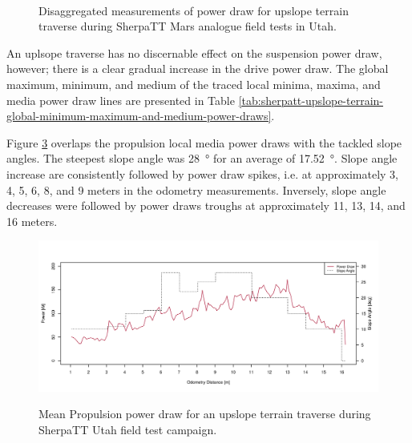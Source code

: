 \begin{figure}[h]
\begin{subfigure}[t]{\subfigureWidth}
		\label{fig:plot:sub:sherpatt-disaggregated-upslope-terrain-power-draw-suspension}
	\end{subfigure}\\[0.8ex]
    \caption[Disaggregated measurements of power draw for upslope terrain traverse during SherpaTT Mars analogue field tests in Utah]
            {Disaggregated measurements of power draw for upslope terrain traverse during SherpaTT Mars analogue field tests in Utah.}
    \label{fig:plot:sherpatt-disaggregated-upslope-terrain-power-draw}
\vspace{-2ex}
\end{figure}

An uplsope traverse has no discernable effect on the suspension power draw, however; there is a clear gradual increase in the drive power draw. The global maximum, minimum, and medium of the traced local minima, maxima, and media power draw lines are presented in Table \ref{tab:sherpatt-upslope-terrain-global-minimum-maximum-and-medium-power-draws}.



Figure \ref{fig:plot:sherpatt-upslope-terrain-power-draw} overlaps the propulsion local media power draws with the tackled slope angles. The steepest slope angle was \SI{28}{\degree} for an average of \SI{17.52}{\degree}. Slope angle increase are consistently followed by power draw spikes, i.e. at approximately 3, 4, 5, 6, 8, and 9 meters in the odometry measurements. Inversely, slope angle decreases were followed by power draws troughs at approximately 11, 13, 14, and 16 meters.

\clearpage
\begin{figure}[h]
  \centering
  \hypersetup{linkcolor=captionTextColor}
  \includegraphics[width=0.8\linewidth]{sections/locomotion-power-draws/plots/minima-locomotion-power-draws-on-upslope-terrain.png}\\
  \caption[Mean Propulsion power draw for an upslope terrain traverse during SherpaTT Utah field test campaign.]
          {Mean Propulsion power draw for an upslope terrain traverse during SherpaTT Utah field test campaign.}
  \label{fig:plot:sherpatt-upslope-terrain-power-draw}
\end{figure}


